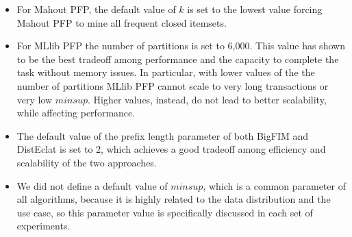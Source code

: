 \begin{itemize}
\item
For Mahout PFP, the default value of $k$ is set to the lowest value forcing
Mahout PFP to mine all frequent closed itemsets.
\item
For MLlib PFP the number of partitions is set to 6,000.
This value has shown to be the best tradeoff among performance
and the capacity to complete the task without memory issues.
In particular, with lower values of the the number of partitions MLlib PFP
cannot scale to very long transactions or very low $minsup$.
Higher values, instead, do not lead to better scalability, while affecting performance.
\item
The default value
of the prefix length parameter of both BigFIM and DistEclat is set to 2, which achieves a good tradeoff 
among efficiency and scalability of the two approaches.


\item We did not define a default value of $minsup$,
which is a common parameter of all algorithms, 
because it is highly related to the data distribution and the use case, 
so this parameter value is specifically discussed in each set of experiments.
\end{itemize}





